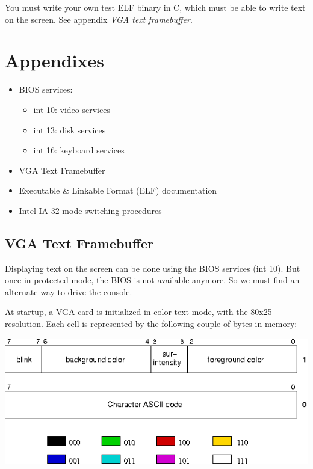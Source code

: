 You must write your own test ELF binary in C, which must be able to
write text on the screen. See appendix \emph{VGA text framebuffer}.

\newpage

\section{Appendixes}

\begin{itemize}
\item
  BIOS services:
  \begin{itemize}
  \item
    int 10: video services
  \item
    int 13: disk services
  \item
    int 16: keyboard services
  \end{itemize}
\item
  VGA Text Framebuffer
\item
  Executable \& Linkable Format (ELF) documentation
\item
  Intel IA-32 mode switching procedures
\end{itemize}

%
%
















%
%

\subsection*{VGA Text Framebuffer}

Displaying text on the screen can be done using the BIOS services (int
10). But once in protected mode, the BIOS is not available anymore. So
we must find an alternate way to drive the console.

At startup, a VGA card is initialized in color-text mode, with the
80x25 resolution. Each cell is represented by the following couple of
bytes in memory:

\begin{center}
\includegraphics[width=\linewidth]{vga-text}
\end{center}

